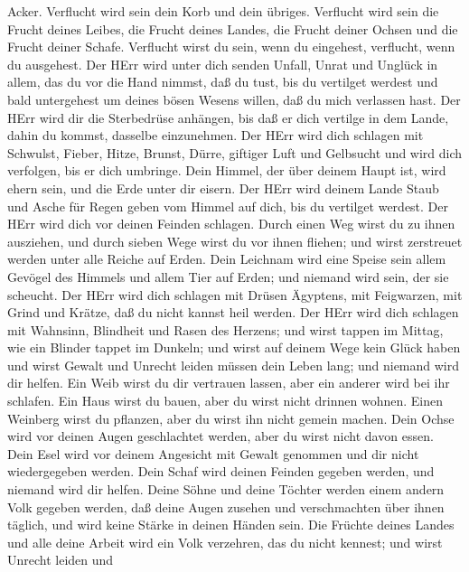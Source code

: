 Acker.  Verflucht wird sein dein Korb und dein übriges.
 Verflucht wird sein die Frucht deines Leibes, die Frucht
deines Landes, die Frucht deiner Ochsen und die Frucht deiner Schafe.
 Verflucht wirst du sein, wenn du eingehest, verflucht,
wenn du ausgehest.  Der HErr wird unter dich senden Unfall,
Unrat und Unglück in allem, das du vor die Hand nimmst, daß du tust, bis
du vertilget werdest und bald untergehest um deines bösen Wesens willen,
daß du mich verlassen hast.  Der HErr wird dir die
Sterbedrüse anhängen, bis daß er dich vertilge in dem Lande, dahin du
kommst, dasselbe einzunehmen.  Der HErr wird dich schlagen
mit Schwulst, Fieber, Hitze, Brunst, Dürre, giftiger Luft und Gelbsucht
und wird dich verfolgen, bis er dich umbringe.  Dein
Himmel, der über deinem Haupt ist, wird ehern sein, und die Erde unter
dir eisern.  Der HErr wird deinem Lande Staub und Asche für
Regen geben vom Himmel auf dich, bis du vertilget werdest. 
Der HErr wird dich vor deinen Feinden schlagen. Durch einen Weg wirst du
zu ihnen ausziehen, und durch sieben Wege wirst du vor ihnen fliehen;
und wirst zerstreuet werden unter alle Reiche auf Erden. 
Dein Leichnam wird eine Speise sein allem Gevögel des Himmels und allem
Tier auf Erden; und niemand wird sein, der sie scheucht. 
Der HErr wird dich schlagen mit Drüsen Ägyptens, mit Feigwarzen, mit
Grind und Krätze, daß du nicht kannst heil werden.  Der
HErr wird dich schlagen mit Wahnsinn, Blindheit und Rasen des Herzens;
 und wirst tappen im Mittag, wie ein Blinder tappet im
Dunkeln; und wirst auf deinem Wege kein Glück haben und wirst Gewalt und
Unrecht leiden müssen dein Leben lang; und niemand wird dir helfen.
 Ein Weib wirst du dir vertrauen lassen, aber ein anderer
wird bei ihr schlafen. Ein Haus wirst du bauen, aber du wirst nicht
drinnen wohnen. Einen Weinberg wirst du pflanzen, aber du wirst ihn
nicht gemein machen.  Dein Ochse wird vor deinen Augen
geschlachtet werden, aber du wirst nicht davon essen. Dein Esel wird vor
deinem Angesicht mit Gewalt genommen und dir nicht wiedergegeben werden.
Dein Schaf wird deinen Feinden gegeben werden, und niemand wird dir
helfen.  Deine Söhne und deine Töchter werden einem andern
Volk gegeben werden, daß deine Augen zusehen und verschmachten über
ihnen täglich, und wird keine Stärke in deinen Händen sein.
 Die Früchte deines Landes und alle deine Arbeit wird ein
Volk verzehren, das du nicht kennest; und wirst Unrecht leiden und
